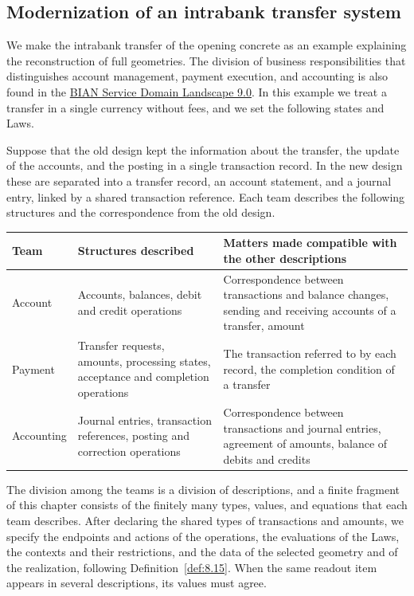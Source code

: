 \subsection*{Modernization of an intrabank transfer system}

We make the intrabank transfer of the opening concrete as an example explaining the
reconstruction of full geometries.
The division of business responsibilities that distinguishes account management, payment
execution, and accounting is also found in the
\href{https://bian.org/wp-content/uploads/2024/12/BIAN-Service-Landscape-V9_0-Value-Chain-View.pdf}{BIAN Service Domain Landscape 9.0}.
In this example we treat a transfer in a single currency without fees, and we set the
following states and Laws.

Suppose that the old design kept the information about the transfer, the update of the
accounts, and the posting in a single transaction record.
In the new design these are separated into a transfer record, an account statement, and a
journal entry, linked by a shared transaction reference.
Each team describes the following structures and the correspondence from the old design.

\begin{xltabular}{\linewidth}{@{}LLL@{}}
\toprule
Team & Structures described & Matters made compatible with the other descriptions \\
\midrule
\endhead
Account & Accounts, balances, debit and credit operations & Correspondence between transactions and balance changes, sending and receiving accounts of a transfer, amount \\
\addlinespace[3pt]
Payment & Transfer requests, amounts, processing states, acceptance and completion operations & The transaction referred to by each record, the completion condition of a transfer \\
\addlinespace[3pt]
Accounting & Journal entries, transaction references, posting and correction operations & Correspondence between transactions and journal entries, agreement of amounts, balance of debits and credits \\
\bottomrule
\end{xltabular}

The division among the teams is a division of descriptions, and a finite fragment of this
chapter consists of the finitely many types, values, and equations that each team describes.
After declaring the shared types of transactions and amounts, we specify the endpoints and
actions of the operations, the evaluations of the Laws, the contexts and their restrictions,
and the data of the selected geometry and of the realization, following
Definition~\ref{def:8.15}.
When the same readout item appears in several descriptions, its values must agree.

